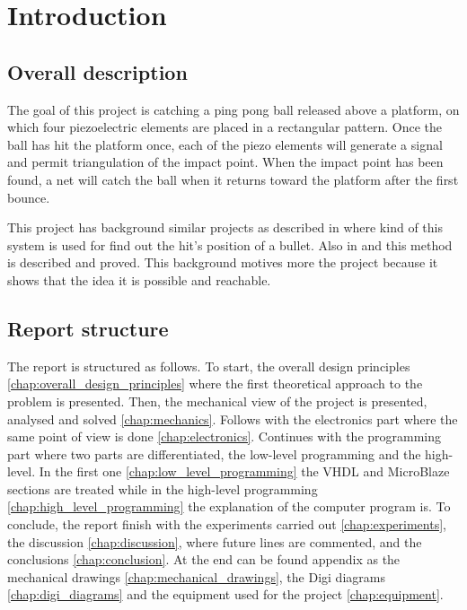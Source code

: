 \chapter{Introduction}
\label{chap:introduction}

	\section{Overall description}
		The goal of this project is catching a ping pong ball released above a platform, on which four piezoelectric elements are placed in a rectangular pattern.
		Once the ball has hit the platform once, each of the piezo elements will generate a signal and permit triangulation of the impact point. When the impact point has been found, a net will catch the ball when it returns toward the platform after the first bounce.

		This project has background similar projects as described in \cite{electronic_target} where kind of this system is used for find out the hit's position of a bullet. Also in \cite{tdoa_book} and \cite{tdoa_notes} this method is described and proved. This background motives more the project because it shows that the idea it is possible and reachable.

	\section{Report structure}
	\label{sec:reportStructure}
		The report is structured as follows. To start, the overall design principles \ref{chap:overall_design_principles} where the first theoretical approach to the problem is presented.
		Then, the mechanical view of the project is presented, analysed and solved \ref{chap:mechanics}.
		Follows with the electronics part where the same point of view is done \ref{chap:electronics}.
		Continues with the programming part where two parts are differentiated, the low-level programming and the high-level.
		In the first one \ref{chap:low_level_programming} the VHDL and MicroBlaze sections are treated while in the high-level programming \ref{chap:high_level_programming} the explanation of the computer program is.
		To conclude, the report finish with the experiments carried out \ref{chap:experiments}, the discussion \ref{chap:discussion}, where future lines are commented, and the conclusions \ref{chap:conclusion}.
		At the end can be found appendix as the mechanical drawings \ref{chap:mechanical_drawings}, the Digi diagrams \ref{chap:digi_diagrams} and the equipment used for the project \ref{chap:equipment}.
